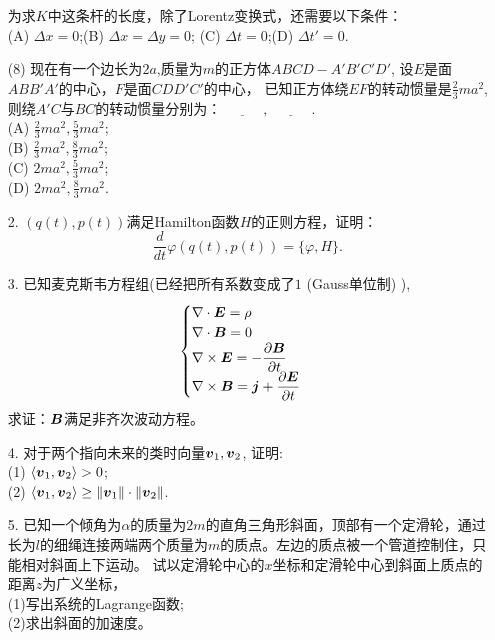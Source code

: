 \begin{itemize}
    为求$K$中这条杆的长度，除了Lorentz变换式，还需要以下条件：\\
    (A) $\Delta x=0$;\quad(B) $\Delta x=\Delta y=0$;\quad 
    (C) $\Delta t=0$;\quad(D) $\Delta t'=0.$
    \item[(8)]现在有一个边长为$2a$,质量为$m$的正方体$ABCD-A'B'C'D'$,
    设$E$是面$ABB'A'$的中心，$F$是面$CDD'C'$的中心，
    已知正方体绕$EF$的转动惯量是$\frac{2}{3}ma^2$,
    则绕$A'C$与$BC$的转动惯量分别为：$\underline{\qquad\quad},\underline{\qquad\quad}$.\\
    (A) $\frac23 ma^2,\frac53 ma^2$;\\
    (B) $\frac23 ma^2,\frac83 ma^2$;\\
    (C) $2ma^2,\frac53 ma^2$;\\
    (D) $2ma^2,\frac83 ma^2$.
    
    \item[2.]$(q(t),p(t))$满足Hamilton函数$H$的正则方程，证明：
    \[\frac{d}{dt} \varphi (q(t), p(t))=\{\varphi ,H \}.\]
    \item[3.]已知麦克斯韦方程组(已经把所有系数变成了$1$ (Gauss单位制) ),
        \[\begin{cases}
         \nabla \cdot \boldsymbol{E} = \rho \\
         \nabla \cdot \boldsymbol{B} = 0  \\
         \nabla \times \boldsymbol{E} = -\dfrac{\partial \boldsymbol{B}}{\partial t} \\
         \nabla \times \boldsymbol{B} = \boldsymbol{j} +\dfrac{\partial \boldsymbol{E}}{\partial t} \\
        \end{cases}\]
    求证：$\boldsymbol{B}$满足非齐次波动方程。
    \item[4.]对于两个指向未来的类时向量$\boldsymbol{v}_1,\boldsymbol{v}_2$, 证明:\\
    (1) $\langle\boldsymbol{v}_1,\boldsymbol{v}_2\rangle >0 $;\\
    (2) $\langle\boldsymbol{v}_1,\boldsymbol{v}_2\rangle \geq \|\boldsymbol{v}_1\|\cdot\|\boldsymbol{v}_2\| $.
    \item[5.]已知一个倾角为$\alpha$的质量为$2m$的直角三角形斜面，顶部有一个定滑轮，通过长为$l$的细绳连接两端两个质量为$m$的质点。左边的质点被一个管道控制住，只能相对斜面上下运动。
    试以定滑轮中心的$x$坐标和定滑轮中心到斜面上质点的距离$z$为广义坐标，\\
    (1)写出系统的Lagrange函数;\\
    (2)求出斜面的加速度。


\end{itemize}
